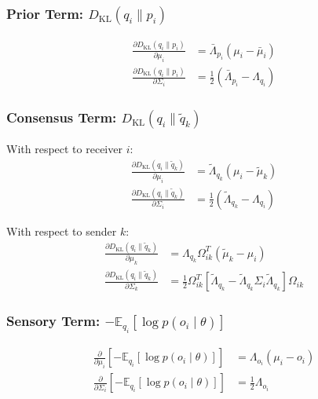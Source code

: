 \documentclass[12pt]{article}
\begin{document}
\subsubsection{Prior Term: $D_{\mathrm{KL}}(q_i \| p_i)$}

\begin{align}
\frac{\partial D_{\mathrm{KL}}(q_i \| p_i)}{\partial \mu_i} &= \bar{\Lambda}_{p_i}(\mu_i - \bar{\mu}_i) \label{eq:grad_prior_mu} \\[6pt]
\frac{\partial D_{\mathrm{KL}}(q_i \| p_i)}{\partial \Sigma_i} &= \frac{1}{2}(\bar{\Lambda}_{p_i} - \Lambda_{q_i}) \label{eq:grad_prior_sigma}
\end{align}

\subsubsection{Consensus Term: $D_{\mathrm{KL}}(q_i \| \tilde{q}_k)$}

With respect to receiver $i$:
\begin{align}
\frac{\partial D_{\mathrm{KL}}(q_i \| \tilde{q}_k)}{\partial \mu_i} &= \tilde{\Lambda}_{q_k}(\mu_i - \tilde{\mu}_k) \label{eq:grad_consensus_mu_i} \\[6pt]
\frac{\partial D_{\mathrm{KL}}(q_i \| \tilde{q}_k)}{\partial \Sigma_i} &= \frac{1}{2}(\tilde{\Lambda}_{q_k} - \Lambda_{q_i}) \label{eq:grad_consensus_sigma_i}
\end{align}

With respect to sender $k$:
\begin{align}
\frac{\partial D_{\mathrm{KL}}(q_i \| \tilde{q}_k)}{\partial \mu_k} &= \Lambda_{q_k}\Omega_{ik}^T(\tilde{\mu}_k - \mu_i) \label{eq:grad_consensus_mu_k} \\[6pt]
\frac{\partial D_{\mathrm{KL}}(q_i \| \tilde{q}_k)}{\partial \Sigma_k} &= \frac{1}{2}\Omega_{ik}^T\left[\tilde{\Lambda}_{q_k} - \tilde{\Lambda}_{q_k}\Sigma_i\tilde{\Lambda}_{q_k}\right]\Omega_{ik} \label{eq:grad_consensus_sigma_k}
\end{align}

\subsubsection{Sensory Term: $-\mathbb{E}_{q_i}[\log p(o_i \mid \theta)]$}

\begin{align}
\frac{\partial}{\partial \mu_i}\left[-\mathbb{E}_{q_i}[\log p(o_i \mid \theta)]\right] &= \Lambda_{o_i}(\mu_i - o_i) \label{eq:grad_sensory_mu} \\[6pt]
\frac{\partial}{\partial \Sigma_i}\left[-\mathbb{E}_{q_i}[\log p(o_i \mid \theta)]\right] &= \frac{1}{2}\Lambda_{o_i} \label{eq:grad_sensory_sigma}
\end{align}
\end{document}
